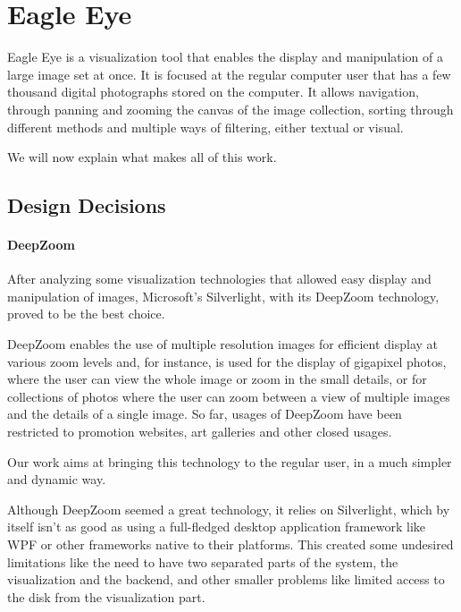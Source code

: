 \chapter{Eagle Eye}
\label{cha:eagle_eye}


Eagle Eye is a visualization tool that enables the display and manipulation of a large image set at once. It is focused at the regular computer user that has a few thousand digital photographs stored on the computer. It allows navigation, through panning and zooming the canvas of the image collection, sorting through different methods and multiple ways of filtering, either textual or visual.

We will now explain what makes all of this work.


\section{Design Decisions} %
\label{sub:design_decisions}

\subsubsection{DeepZoom} %
\label{ssub:deepzoom}

After analyzing some visualization technologies that allowed easy display and manipulation of images, Microsoft’s Silverlight, with its DeepZoom technology, proved to be the best choice.

DeepZoom enables the use of multiple resolution images for efficient display at various zoom levels and, for instance, is used for the display of gigapixel photos, where the user can view the whole image or zoom in the small details, or for collections of photos where the user can zoom between a view of multiple images and the details of a single image. So far, usages of DeepZoom have been restricted to promotion websites, art galleries and other closed usages.

Our work aims at bringing this technology to the regular user, in a much simpler and dynamic way.

Although DeepZoom seemed a great technology, it relies on Silverlight, which by itself isn't as good as using a full-fledged desktop application framework like \ac{WPF} or other frameworks native to their platforms. This created some undesired limitations like the need to have two separated parts of the system, the visualization and the backend, and other smaller problems like limited access to the disk from the visualization part.

